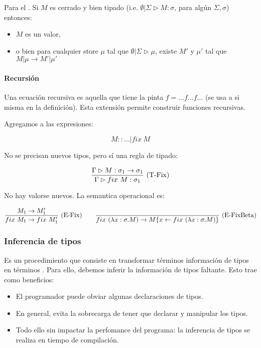Para el . Si $M$ es cerrado y bien tipado (i.e. $\emptyset|\Sigma \rhd M : \sigma$, para algún $\Sigma, \sigma$) entonces:
\begin{itemize}
  \item $M$ es un valor,
  \item  o bien para cualquier store $\mu$ tal que $\emptyset|\Sigma \rhd \mu$, existe $M'$ y $\mu'$ tal que $M \vert \mu \to M' \vert \mu'$
\end{itemize}

\paragraph{Recursión}

Una ecuación recursiva es aquella que tiene la pinta $f = \dots f \dots f \dots$ (se usa a si misma en la definición). Esta extensión permite construir funciones recursivas.

Agregamos a las expresiones:

\[M :: \dots \vert fix\ M\]

No se precisan nuevos tipos, pero sí una regla de tipado:

\[\frac{\Gamma \rhd M : \sigma_1 \to \sigma_1}{\Gamma \rhd fix\ M : \sigma_1}\ \text{(T-Fix)}\]

No hay valorse nuevos. La semantica operacional es:

\[\deriv{M_1 \to M_1'}{fix\ M_1 \to fix\ M_1'}{E-Fix}\quad\quad \deriv{}{fix\ (\abs{x}{\sigma}{M}) \to \sust{M}{x\from fix\  (\abs{x}{\sigma}{M})}}{E-FixBeta}\]

\subsubsection{Inferencia de tipos}

Es un procedimiento que consiste en transformar términos  información de tipos en términos . Para ello, debemos inferir la información de tipos faltante. Esto trae como beneficios:

\begin{itemize}
  \item El programador puede obviar algunas declaraciones de tipos.
  \item En general, evita la sobrecarga de tener que declarar y manipular  los tipos.
  \item Todo ello sin impactar la perfomance del programa: la inferencia de tipos se realiza en tiempo de compilación.
\end{itemize}

